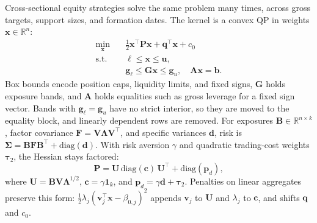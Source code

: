 \documentclass[10pt,twocolumn,letterpaper]{article}
\begin{document}
Cross-sectional equity strategies solve the same problem many times, across gross targets, support sizes, and formation dates. The kernel is a convex QP in weights $\mathbf{x} \in \mathbb{R}^n$:
\begin{align}
\min_{\mathbf{x}} \quad & \frac{1}{2}\mathbf{x}^\top \mathbf{P}\mathbf{x} + \mathbf{q}^\top \mathbf{x} + c_0 \nonumber\\
\text{s.t.} \quad & \bm{\ell} \le \mathbf{x} \le \mathbf{u}, \nonumber\\
& \mathbf{g}_\ell \le \mathbf{G}\mathbf{x} \le \mathbf{g}_u, \quad \mathbf{A}\mathbf{x} = \mathbf{b}. \label{eq:qp}
\end{align}
Box bounds encode position caps, liquidity limits, and fixed signs, $\mathbf{G}$ holds exposure bands, and $\mathbf{A}$ holds equalities such as gross leverage for a fixed sign vector. Bands with $\mathbf{g}_\ell = \mathbf{g}_u$ have no strict interior, so they are moved to the equality block, and linearly dependent rows are removed. For exposures $\mathbf{B} \in \mathbb{R}^{n \times k}$, factor covariance $\mathbf{F} = \mathbf{V}\bm{\Lambda}\mathbf{V}^\top$, and specific variances $\mathbf{d}$, risk is $\bm{\Sigma} = \mathbf{B}\mathbf{F}\mathbf{B}^\top + \mathrm{diag}(\mathbf{d})$. With risk aversion $\gamma$ and quadratic trading-cost weights $\bm{\tau}_2$, the Hessian stays factored:
\begin{equation}
\mathbf{P} = \mathbf{U}\,\mathrm{diag}(\mathbf{c})\,\mathbf{U}^\top + \mathrm{diag}(\mathbf{p}_d), \label{eq:p_factored}
\end{equation}
where $\mathbf{U} = \mathbf{B}\mathbf{V}\bm{\Lambda}^{1/2}$, $\mathbf{c} = \gamma \mathbf{1}_k$, and $\mathbf{p}_d = \gamma \mathbf{d} + \bm{\tau}_2$. Penalties on linear aggregates preserve this form: $\frac{1}{2}\lambda_j (\mathbf{v}_j^\top \mathbf{x} - \beta_{0,j})^2$ appends $\mathbf{v}_j$ to $\mathbf{U}$ and $\lambda_j$ to $\mathbf{c}$, and shifts $\mathbf{q}$ and $c_0$.
\end{document}
